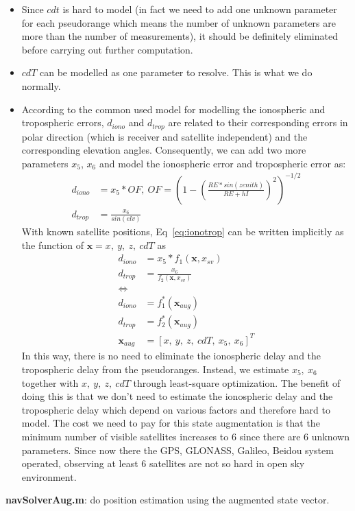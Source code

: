 \documentclass[a4paper]{report}
\begin{document}
\begin{itemize}
\item Since $cdt$ is hard to model (in fact we need to add one unknown parameter for each pseudorange which means the number of unknown parameters are more than the number of measurements), it should be definitely eliminated before carrying out further computation.
\item $cdT$ can be modelled as one parameter to resolve. This is what we do normally.
\item According to the common used model for modelling the ionospheric and tropospheric errors, $d_{iono}$ and $d_{trop}$ are related to their corresponding errors in polar direction (which is receiver and satellite independent) and the corresponding elevation angles. Consequently, we can add two more parameters $x_5$, $x_6$ and model the ionospheric error and tropospheric error as:
\begin{align}
d_{iono}&= x_5 * OF,\ OF = \left(1-\left(\frac{RE*sin(zenith)}{RE+hI}\right)^2\right)^{-1/2} \\
d_{trop}&= \frac{x_6}{sin(elv)}
\label{eq:ionotrop}
\end{align}
With known satellite positions, Eq~\ref{eq:ionotrop} can be written implicitly as the function of $\mathbf{x}={x,\ y,\ z,\ cdT}$ as
\begin{align}
d_{iono}&= x_5 * f_1(\mathbf{x}, x_{sv}) \\
d_{trop}&= \frac{x_6}{ f_2(\mathbf{x}, x_{sv})} \\
\Leftrightarrow \nonumber \\
d_{iono}&= f_1^*(\mathbf{x}_{aug}) \\
d_{trop}&= f_2^*(\mathbf{x}_{aug}) \\
\mathbf{x}_{aug} &= [x,\ y,\ z,\ cdT,\ x_5,\ x_6]^T \nonumber
\end{align}
In this way, there is no need to eliminate the ionospheric delay and the tropospheric delay from the pseudoranges. Instead, we estimate $x_5,\ x_6$ together with $x,\ y,\ z,\ cdT$ through least-square optimization. The benefit of doing this is that we don't need to estimate the ionospheric delay and the tropospheric delay which depend on various factors and therefore hard to model. The cost we need to pay for this state augmentation is that the minimum number of visible satellites increases to 6 since there are 6 unknown parameters. Since now there the GPS, GLONASS, Galileo, Beidou system operated, observing at least 6 satellites are not so hard in open sky environment.
\end{itemize}
\textbf{navSolverAug.m}: do position estimation using the augmented state vector.
\end{document}
